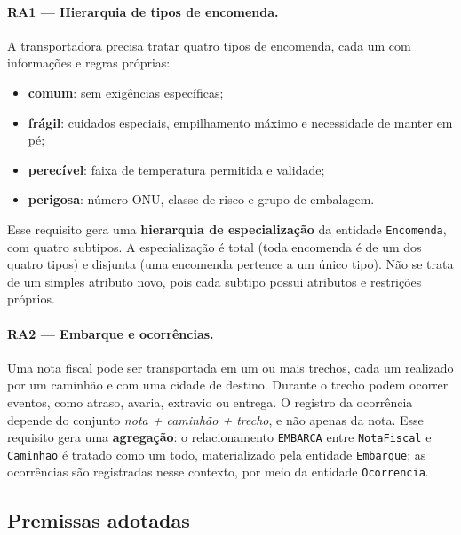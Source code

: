 \paragraph{RA1 --- Hierarquia de tipos de encomenda.}
A transportadora precisa tratar quatro tipos de encomenda, cada um com informações e regras próprias:
\begin{itemize}
  \item \textbf{comum}: sem exigências específicas;
  \item \textbf{frágil}: cuidados especiais, empilhamento máximo e necessidade de manter em pé;
  \item \textbf{perecível}: faixa de temperatura permitida e validade;
  \item \textbf{perigosa}: número ONU, classe de risco e grupo de embalagem.
\end{itemize}
Esse requisito gera uma \textbf{hierarquia de especialização} da entidade \texttt{Encomenda}, com quatro subtipos. A especialização é total (toda encomenda é de um dos quatro tipos) e disjunta (uma encomenda pertence a um único tipo). Não se trata de um simples atributo novo, pois cada subtipo possui atributos e restrições próprios.

\paragraph{RA2 --- Embarque e ocorrências.}
Uma nota fiscal pode ser transportada em um ou mais trechos, cada um realizado por um caminhão e com uma cidade de destino. Durante o trecho podem ocorrer eventos, como atraso, avaria, extravio ou entrega. O registro da ocorrência depende do conjunto \emph{nota + caminhão + trecho}, e não apenas da nota. Esse requisito gera uma \textbf{agregação}: o relacionamento \texttt{EMBARCA} entre \texttt{NotaFiscal} e \texttt{Caminhao} é tratado como um todo, materializado pela entidade \texttt{Embarque}; as ocorrências são registradas nesse contexto, por meio da entidade \texttt{Ocorrencia}.

\subsection{Premissas adotadas}
\label{sec:premissas}

